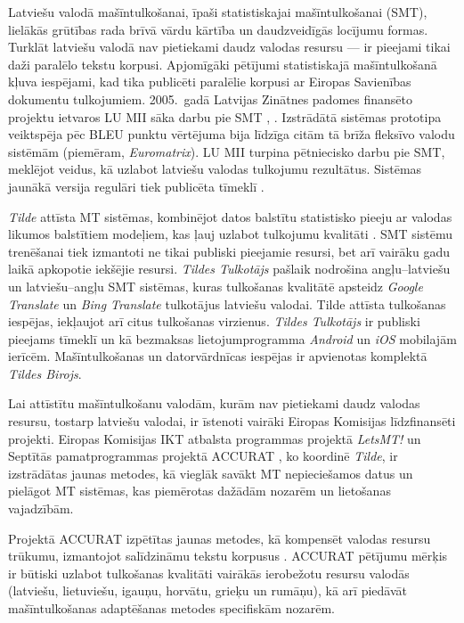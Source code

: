 \begin{multicols}{2}
Latviešu valodā mašīntulkošanai, īpaši statistiskajai mašīntulkošanai (SMT), lielākās grūtības rada brīvā vārdu kārtība un daudzveidīgās locījumu formas. 
Turklāt latviešu valodā nav pietiekami daudz valodas resursu — ir pieejami tikai daži paralēlo tekstu korpusi. 
Apjomīgāki pētījumi statistiskajā mašīntulkošanā kļuva iespējami, kad tika publicēti paralēlie korpusi ar Eiropas Savienības dokumentu tulkojumiem.
2005.~gadā Latvijas Zinātnes padomes finansēto projektu ietvaros LU MII sāka darbu pie SMT \cite{Meta25}, \cite{Meta26}.
Izstrādātā sistēmas prototipa veiktspēja pēc BLEU punktu vērtējuma bija līdzīga citām tā brīža fleksīvo valodu sistēmām (piemēram, \textit{Euromatrix}). 
LU MII turpina pētniecisko darbu pie SMT, meklējot veidus, kā uzlabot latviešu valodas tulkojumu rezultātus. 
Sistēmas jaunākā versija regulāri tiek publicēta tīmeklī \cite{Meta27}.

\textit{Tilde} attīsta MT sistēmas, kombinējot datos balstītu statistisko pieeju ar valodas likumos balstītiem modeļiem, kas ļauj uzlabot tulkojumu kvalitāti \cite{Meta29}.
SMT sistēmu trenēšanai tiek izmantoti ne tikai publiski pieejamie resursi, bet arī vairāku gadu laikā apkopotie iekšējie resursi.
\textit{Tildes Tulkotājs} pašlaik nodrošina angļu--latviešu un latviešu--angļu SMT sistēmas, kuras tulkošanas kvalitātē apsteidz \textit{Google Translate} un \textit{Bing Translate} tulkotājus latviešu valodai. 
Tilde attīsta tulkošanas iespējas, iekļaujot arī citus tulkošanas virzienus.
\textit{Tildes Tulkotājs} ir publiski pieejams tīmeklī \cite{Meta28} un kā bezmaksas lietojumprogramma \textit{Android} un \textit{iOS} mobilajām ierīcēm. 
Mašīntulkošanas un datorvārdnīcas iespējas ir apvienotas komplektā \textit{Tildes Birojs}.

Lai attīstītu mašīntulkošanu valodām, kurām nav pietiekami daudz valodas resursu, tostarp latviešu valodai, ir īstenoti vairāki Eiropas Komisijas līdzfinansēti projekti. 
Eiropas Komisijas IKT atbalsta programmas projektā \textit{LetsMT!} \cite{Meta30} un Septītās pamatprogrammas projektā ACCURAT \cite{Meta31}, ko koordinē \textit{Tilde}, ir izstrādātas jaunas metodes, kā vieglāk savākt MT nepieciešamos datus un pielāgot MT sistēmas, kas piemērotas dažādām nozarēm un lietošanas vajadzībām.

Projektā ACCURAT izpētītas jaunas metodes, kā kompensēt valodas resursu trūkumu, izmantojot salīdzināmu tekstu korpusus \cite{Meta32} \cite{Meta33}. 
ACCURAT pētījumu mērķis ir būtiski uzlabot tulkošanas kvalitāti vairākās ierobežotu resursu valodās (latviešu, lietuviešu, igauņu, horvātu, grieķu un rumāņu), kā arī piedāvāt mašīntulkošanas adaptēšanas metodes specifiskām nozarēm.


\end{multicols}
